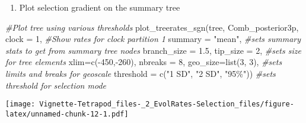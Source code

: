 \documentclass[
]{article}
\newenvironment{Shaded}{\begin{snugshade}}{\end{snugshade}}
\newcommand{\AttributeTok}[1]{\textcolor[rgb]{0.77,0.63,0.00}{#1}}
\newcommand{\CommentTok}[1]{\textcolor[rgb]{0.56,0.35,0.01}{\textit{#1}}}
\newcommand{\DecValTok}[1]{\textcolor[rgb]{0.00,0.00,0.81}{#1}}
\newcommand{\FloatTok}[1]{\textcolor[rgb]{0.00,0.00,0.81}{#1}}
\newcommand{\FunctionTok}[1]{\textcolor[rgb]{0.00,0.00,0.00}{#1}}
\newcommand{\NormalTok}[1]{#1}
\newcommand{\SpecialCharTok}[1]{\textcolor[rgb]{0.00,0.00,0.00}{#1}}
\newcommand{\StringTok}[1]{\textcolor[rgb]{0.31,0.60,0.02}{#1}}
\providecommand{\tightlist}{%
  \setlength{\itemsep}{0pt}\setlength{\parskip}{0pt}}
\begin{document}
\begin{enumerate}
\def\labelenumi{\arabic{enumi}.}
\setcounter{enumi}{3}
\tightlist
\item
  Plot selection gradient on the summary tree
\end{enumerate}

\begin{Shaded}
\begin{Highlighting}[]
\CommentTok{\#Plot tree using various thresholds}
\FunctionTok{plot\_treerates\_sgn}\NormalTok{(tree, Comb\_posterior3p, }
                   \AttributeTok{clock =} \DecValTok{1}\NormalTok{,               }\CommentTok{\#Show rates for clock partition 1}
                   \AttributeTok{summary =} \StringTok{"mean"}\NormalTok{,        }\CommentTok{\#sets summary stats to get from summary tree nodes}
                   \AttributeTok{branch\_size =} \FloatTok{1.5}\NormalTok{, }\AttributeTok{tip\_size =} \DecValTok{2}\NormalTok{,                      }\CommentTok{\#sets size for tree elements}
                   \AttributeTok{xlim=}\FunctionTok{c}\NormalTok{(}\SpecialCharTok{{-}}\DecValTok{450}\NormalTok{,}\SpecialCharTok{{-}}\DecValTok{260}\NormalTok{), }\AttributeTok{nbreaks =} \DecValTok{8}\NormalTok{, }\AttributeTok{geo\_size=}\FunctionTok{list}\NormalTok{(}\DecValTok{3}\NormalTok{, }\DecValTok{3}\NormalTok{),  }\CommentTok{\#sets limits and breaks for geoscale}
                   \AttributeTok{threshold =} \FunctionTok{c}\NormalTok{(}\StringTok{"1 SD"}\NormalTok{, }\StringTok{"2 SD"}\NormalTok{, }\StringTok{"95\%"}\NormalTok{))                 }\CommentTok{\#sets threshold for selection mode}
\end{Highlighting}
\end{Shaded}

\texttt{[image: Vignette-Tetrapod\_files-\_2\_EvolRates-Selection\_files/figure-latex/unnamed-chunk-12-1.pdf]}
\end{document}
